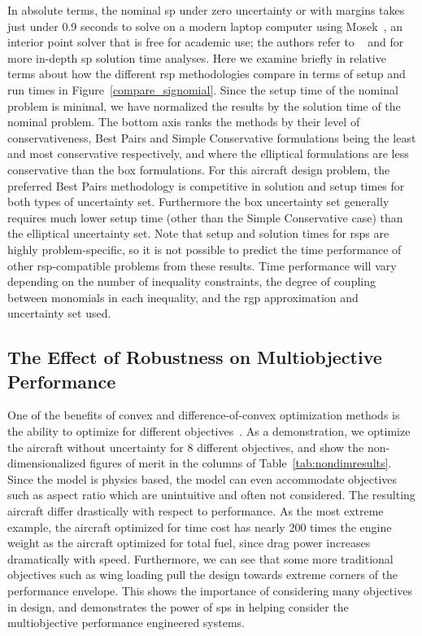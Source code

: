 In absolute
terms, the nominal \gls{sp} under zero uncertainty or with margins
takes just under 0.9 seconds to solve on a modern laptop computer using Mosek~\cite{mosek},
an interior point solver that is free for academic use; the authors
refer to ~\cite{Kirschen2018Log} and \cite{York2018} for more in-depth \gls{sp} solution time analyses.
Here we examine briefly in relative terms about how the different \gls{rsp} methodologies compare in terms of setup and
run times in Figure~\ref{compare_signomial}. Since the setup time of the nominal problem is minimal,
we have normalized the results by the solution time of the nominal problem.
The bottom axis ranks the methods by their level of conservativeness, Best Pairs
and Simple Conservative formulations being the least and most conservative respectively,
and where the elliptical formulations are less conservative than the box formulations.
For this aircraft design problem, the preferred Best Pairs methodology
is competitive in solution and setup times for both types of uncertainty set. Furthermore
the box uncertainty set generally requires much lower setup time (other than the Simple Conservative case)
than the elliptical uncertainty set.
Note that setup and solution times for \gls{rsp}s are highly problem-specific, so it is not possible
to predict the time performance of other \gls{rsp}-compatible problems from these results.
Time performance will vary depending on the number of inequality constraints,
the degree of coupling between monomials
in each inequality, and the \gls{rgp} approximation and uncertainty set used.

\subsection{The Effect of Robustness on Multiobjective Performance}

One of the benefits of convex and difference-of-convex optimization methods is the ability to optimize for
different objectives~\cite{York2018}. As a demonstration, we optimize the aircraft without uncertainty
for 8 different objectives, and show
the non-dimensionalized figures of merit in the columns of Table~\ref{tab:nondimresults}.
Since the model is physics based, the model can even accommodate objectives such as aspect ratio
which are unintuitive and often not considered. The resulting aircraft
differ drastically with respect to performance.
As the most extreme example,
the aircraft optimized for time cost has nearly 200 times the engine weight as the aircraft
optimized for total fuel, since drag power increases dramatically with speed. Furthermore, we can see
that some more traditional objectives such as wing loading pull the design
towards extreme corners of the performance envelope. This shows the importance of considering many objectives
in design, and demonstrates the power of \gls{sp}s in helping
consider the multiobjective performance engineered systems.

